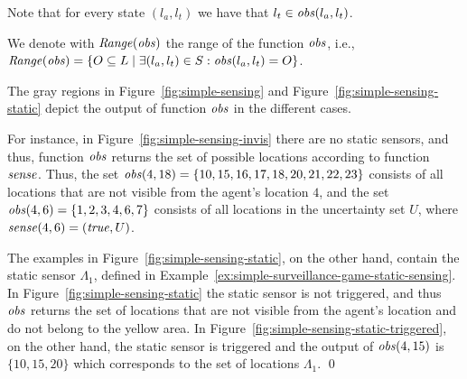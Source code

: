 Note that for every state $(l_a,l_t)$ we have that $l_t \in \mathit{obs}(l_a,l_t)$.

We denote with $\mathit{Range}(\mathit{obs})$ the range of the function $\mathit{obs}$, i.e., $\mathit{Range}(\mathit{obs}) = \{O \subseteq L \mid \exists (l_a,l_t) \in S : \mathit{obs}(l_a,l_t) = O\}$.

\bigskip
\begin{eg}
The gray regions in Figure~\ref{fig:simple-sensing} and  Figure~\ref{fig:simple-sensing-static} depict the output of function $\mathit{obs}$ in the different cases. 

For instance, in Figure~\ref{fig:simple-sensing-invis} there are no static sensors, and thus, function $\mathit{obs}$ returns the set of possible locations according to function $\mathit{sense}$. Thus, the set $\mathit{obs}(4,18) = \{10,15,16,17,18,20,21,22,23\}$ consists of all locations that are not visible from the agent's location $4$, and the set $\mathit{obs}(4,6) = \{1,2,3,4,6,7\}$ consists of all locations in the uncertainty set $U$, where $\mathit{sense}(4,6) = (\mathit{true},U)$.

The examples in Figure~\ref{fig:simple-sensing-static}, on the other hand, contain the static sensor $\Lambda_1$, defined in Example~\ref{ex:simple-surveillance-game-static-sensing}. In Figure~\ref{fig:simple-sensing-static} the static sensor is not triggered, and thus $\mathit{obs}$ returns the set of locations that are not visible from the agent's location and do not belong to the yellow area. In Figure~\ref{fig:simple-sensing-static-triggered}, on the other hand, the static sensor is triggered and the output of $\mathit{obs}(4,15)$ is $\{10,15,20\}$ which corresponds to the set of locations $\Lambda_1$.
\qed
\end{eg}



